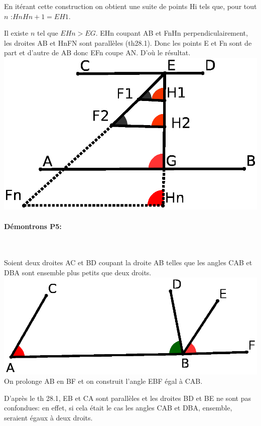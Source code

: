 \documentclass[a4paper, 12pt, twoside]{book}
\begin{document}
 
  En itérant cette construction on obtient une suite de points Hi tels que, pour tout $n$ :$HnHn+1=EH1$.\
 
 Il existe $n$ tel que $EHn>EG$. EHn coupant AB et FnHn perpendiculairement, les droites AB et HnFN sont parallèles (th28.1). Donc les points E et Fn sont de part et d'autre de AB donc EFn coupe AN. D'où le résultat.\\
 
  \includegraphics[scale=0.5]{figures/WALLIS6.eps}\\
  
  
  \newpage \paragraph{Démontrons P5:}\
  
  Soient deux droites AC et BD coupant la droite AB telles que les angles CAB et DBA sont ensemble plus petits que deux droits. \\
 
  
  \includegraphics[scale=0.7]{figures/WALLIS7.eps}\\
  
   
  On prolonge AB en BF et on construit l'angle EBF égal à CAB. \
  
  D'après le th 28.1, EB et CA sont parallèles et les droites BD et BE ne sont pas confondues: en effet, si cela était le cas les angles CAB et DBA, ensemble, seraient égaux à deux droits.\
  
\end{document}
